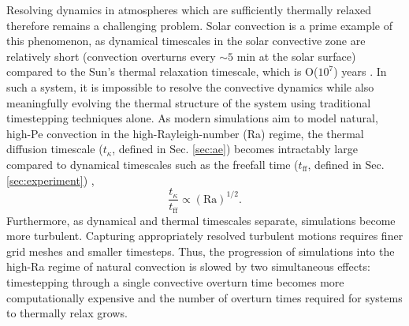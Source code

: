 Resolving dynamics in atmospheres which are sufficiently
thermally relaxed therefore remains a challenging problem.
Solar convection is a prime example of this phenomenon, as
dynamical timescales in the solar convective zone are relatively short 
(convection overturns every $\sim 5$ min at the solar surface)
compared to the Sun's thermal relaxation timescale, which is O($10^7$) years
\cite{stix2003}.  
In such a system, it is impossible to resolve the convective dynamics while also
meaningfully evolving the thermal structure of the system using
traditional timestepping techniques alone.
As modern simulations aim to model natural, high-Pe convection
in the high-Rayleigh-number (Ra) regime,
the thermal diffusion timescale ($t_{\kappa}$, defined in Sec. \ref{sec:ae}) 
becomes intractably large compared to dynamical timescales 
such as the freefall time ($t_{\text{ff}}$, defined in Sec. \ref{sec:experiment})
\cite{anders&brown2017}, 
\begin{equation}
\frac{t_{\kappa}}{t_{\text{ff}}} \propto (\text{Ra})^{1/2}.
\end{equation}
Furthermore, as dynamical and thermal timescales separate, 
simulations become more turbulent. Capturing appropriately resolved
turbulent motions requires finer grid meshes and smaller timesteps.
Thus, the progression of simulations into the high-Ra
regime of natural convection is slowed by two simultaneous effects: timestepping
through a single convective overturn time becomes more computationally expensive
and the number of overturn times required for systems to thermally relax
grows.

